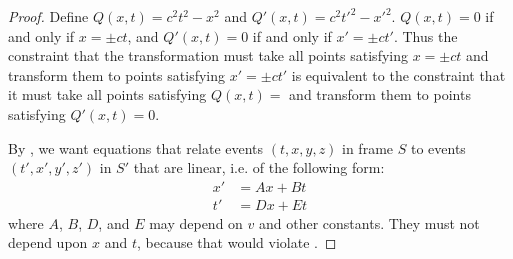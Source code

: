 \documentclass[a4paper]{article}
\theoremstyle{plain}
\theoremstyle{definition}
\begin{document}
\begin{proof}
Define $Q(x,t) = c^2 t^2 - x^2$ and $Q'(x,t) = c^2 t'^2 - x'^2$.
$Q(x,t)=0$ if and only if $x = \pm ct$, and
$Q'(x,t)=0$ if and only if $x' = \pm ct'$.
Thus the constraint that the transformation must take all points
satisfying $x = \pm ct$ and transform them to points satisfying $x' =
\pm ct'$ is equivalent to the constraint that it must take all points
satisfying $Q(x,t)=$ and transform them to points satisfying
$Q'(x,t)=0$.

By \linearity, we want equations that relate events $(t, x, y, z)$ in
frame $S$ to events $(t', x', y', z')$ in $S'$ that are linear,
i.e. of the following form:
\begin{align*}
x' & = Ax + Bt \\
t' & = Dx + Et
\end{align*}
where $A$, $B$, $D$, and $E$ may depend on $v$ and other constants.
They must not depend upon $x$ and $t$, because that would violate
\homogeneity.


\end{proof}
\end{document}
